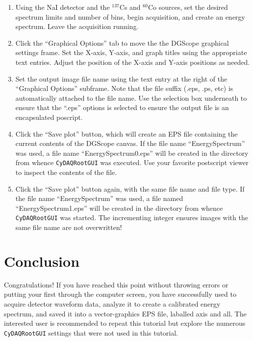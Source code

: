 \begin{enumerate}
  \item{Using the NaI detector and the $^{137}$Cs and $^{60}$Co
    sources, set the desired spectrum limits and number of bins, begin
    acquisition, and create an energy spectrum. Leave the acquisition
    running.}
  \item{Click the ``Graphical Options'' tab to move the the DGScope
    graphical settings frame. Set the X-axis, Y-axis, and graph titles
    using the appropriate text entries. Adjust the position of the
    X-axis and Y-axis positions as needed.}
  \item{Set the output image file name using the text entry at the
    right of the ``Graphical Options'' subframe. Note that the file
    suffix (.eps, .ps, etc) is automatically attached to the file
    name. Use the selection box underneath to ensure that the ``.eps''
    options is selected to ensure the output file is an encapsulated
    poscript.}
  \item{Click the ``Save plot'' button, which will create an EPS file
    containing the current contents of the DGScope canvas. If the file
    name ``EnergySpectrum'' was used, a file name
    ``EnergySpectrum0.eps'' will be created in the directory from
    whence \texttt{CyDAQRootGUI} was executed. Use your favorite
    postscript viewer to inspect the contents of the file.}
  \item{Click the ``Save plot'' button again, with the same file name
    and file type. If the file name ``EnergySpectrum'' was used, a
    file named ``EnergySpectrum1.eps'' will be created in the
    directory from whence \texttt{CyDAQRootGUI} was started. The
    incrementing integer ensures images with the same file name are
    not overwritten!}
\end{enumerate}

\section{Conclusion}
Congratulations! If you have reached this point without throwing
errors or putting your first through the computer screen, you have
successfully used \ADAQ to acquire detector waveform data, analyze it to
create a calibrated energy spectrum, and saved it into a
vector-graphics EPS file, laballed axis and all. The interested user
is recommended to repeat this tutorial but explore the numerous
\texttt{CyDAQRootGUI} settings that were not used in this tutorial.

